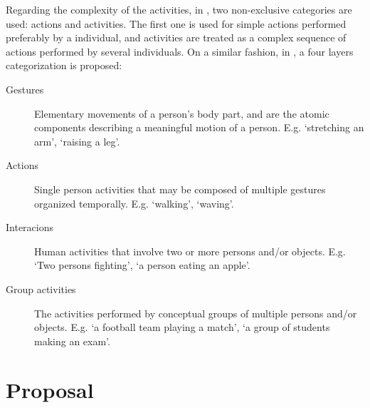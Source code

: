 
Regarding the complexity of the activities, in \citep{Turaga2008_MaRecHuAcSurv}, two non-exclusive categories are used: actions and activities.
The first one is used for simple actions performed preferably by a individual, and activities are treated as a complex sequence of actions performed by several individuals. 
On a similar fashion, in \citep{Aggarwal11_HumanActivity}, a four layers categorization is proposed:

\begin{description}
\item[Gestures] Elementary movements of a person's body part, and are the atomic components describing a meaningful motion of a person. 
E.g. `stretching an arm', `raising a leg'.
\item[Actions] Single person activities that may be composed of multiple gestures organized temporally. 
E.g. `walking', `waving'.
\item[Interacions] Human activities that involve two or more persons and/or objects. 
E.g. `Two persons fighting', `a person eating an apple'.
\item[Group activities] The activities performed by conceptual groups of multiple persons and/or objects. 
E.g. `a football team playing a match', `a group of students making an exam'.
\end{description}











\section{Proposal} %




